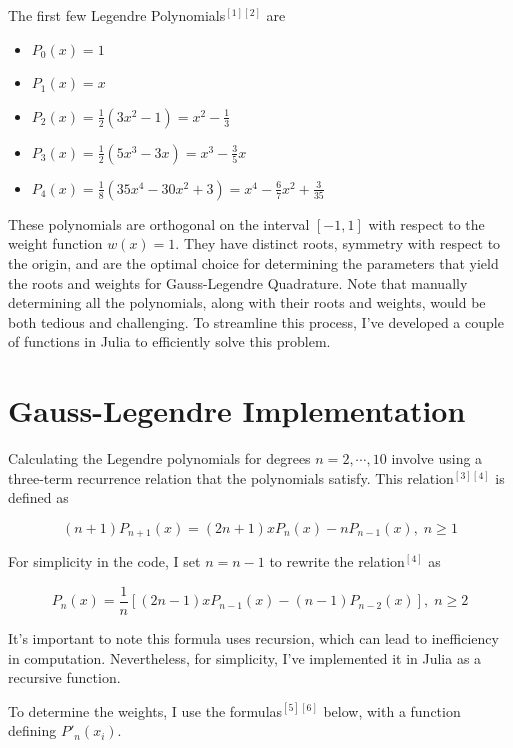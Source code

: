 \documentclass[twoside]{article}
\begin{document}

The first few Legendre Polynomials\(^{[1][2]}\) are
\begin{itemize}
\item $P_0(x) = 1$
\item $P_1(x) = x$
\item $P_2(x) = \frac{1}{2}(3x^2 - 1) = x^2 - \frac{1}{3}$
\item $P_3(x) = \frac{1}{2}(5x^3 - 3x) = x^3 - \frac{3}{5}x$
\item $P_4(x) = \frac{1}{8}(35x^4 - 30x^2 + 3) = x^4 - \frac{6}{7}x^2 + \frac{3}{35}$
\end{itemize}

These polynomials are orthogonal on the interval \([-1, 1]\) with respect to the weight function \(w(x) = 1\).
They have distinct roots, symmetry with respect to the origin, and are the optimal choice for determining the parameters that yield the roots and weights for Gauss-Legendre Quadrature.
Note that manually determining all the polynomials, along with their roots and weights, would be both tedious and challenging. To streamline this process, I've developed a couple of functions in Julia to efficiently solve this problem.


\section{Gauss-Legendre Implementation}
Calculating the Legendre polynomials for degrees \( n = 2, \cdots , 10\) involve using a three-term recurrence relation that the polynomials satisfy. This relation\(^{[3][4]}\) is defined as

\[
(n + 1)P_{n+1}(x) = (2n + 1)xP_n(x) - nP_{n-1}(x),\;  n \ge 1
\]

For simplicity in the code, I set \(n = n-1\) to rewrite the relation\(^{[4]}\) as

\[
P_n(x) = \frac{1}{n} \left[ (2n-1) x P_{n-1}(x) - (n-1) P_{n-2}(x) \right], \;  n \ge 2
\]

It's important to note this formula uses recursion, which can lead to inefficiency in computation. Nevertheless, for simplicity, I've implemented it in Julia as a recursive function.

\newpage

To determine the weights, I use the formulas\(^{[5][6]}\) below, with a function defining \(P'_n(x_i)\).
\end{document}
